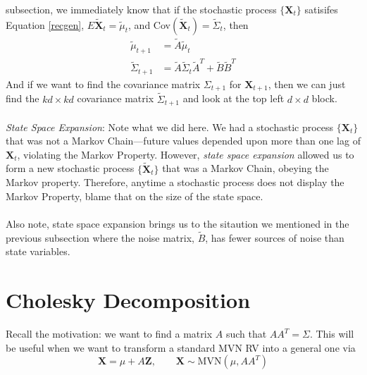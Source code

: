\documentclass[a4paper,12pt]{scrartcl}
\begin{document}
subsection, we immediately know that if the stochastic process
$\{\mathbf{X}_t\}$ satisifes Equation \ref{recgen},
$E\tilde{\mathbf{X}}_t = \tilde{\mu}_t$, and 
Cov$(\tilde{\mathbf{X}}_t) = \tilde{\Sigma}_t$, then
\begin{align*}
    \tilde{\mu}_{t+1} &= \tilde{A}\tilde{\mu}_t \\
    \tilde{\Sigma}_{t+1} &= \tilde{A} \tilde{\Sigma}_t\tilde{A}^T +
	\tilde{B} \tilde{B}^T
\end{align*}
And if we want to find the covariance matrix $\Sigma_{t+1}$ for 
$\mathbf{X}_{t+1}$, then we can just find the $kd \times kd$ 
covariance matrix $\tilde{\Sigma}_{t+1}$ and look at the top left 
$d\times d$ block.
\\
\\
{\sl State Space Expansion}: Note what we did here.  We had a
stochastic process $\{\mathbf{X}_{t}\}$ that was not a Markov 
Chain---future values depended upon more than one lag of 
$\mathbf{X}_t$, violating the Markov Property.  However, 
\emph{state space expansion} allowed us to form a new stochastic
process $\{\tilde{\mathbf{X}}_t\}$ that was a Markov Chain, obeying
the Markov property.  Therefore, anytime a stochastic process 
does not display the Markov Property, blame that on the size of 
the state space.
\\
\\
Also note, state space expansion brings us to the sitaution we
mentioned in the previous subsection where the noise matrix,
$\tilde{B}$, has fewer sources of noise than state variables.


\newpage
\appendix
\section{Cholesky Decomposition}

Recall the motivation: we want to find a matrix $A$ such that
$AA^T = \Sigma$. This will be useful when we want to transform
a standard MVN RV into a general one via
\begin{equation}
    \mathbf{X} = \mu + A\mathbf{Z}, \qquad \mathbf{X}\sim 
	\text{MVN}(\mu, AA^T)
\end{equation}
\end{document}
